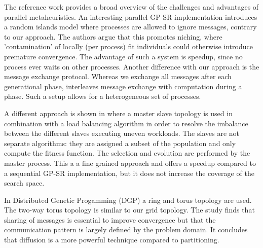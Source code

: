 The reference work \cite{parallelmetaheuristics} provides a broad overview of the challenges and advantages of parallel metaheuristics. An interesting parallel GP-SR implementation \citep{DGPSR} introduces a random islands model where processes are allowed to ignore messages, contrary to our approach. The authors argue that this promotes niching, where 'contamination' of locally (per process) fit individuals could otherwise introduce premature convergence. The advantage of such a system is speedup, since no process ever waits on other processes. Another difference with our approach is the message exchange protocol. 
Whereas we exchange all messages after each generational phase, \citep{DGPSR} interleaves message exchange with computation during a phase. Such a setup allows for a heterogeneous set of processes. 

A different approach is shown in \citep{DFGPSR} where a master slave topology is used in combination with a load balancing algorithm in order to resolve the imbalance between the different slaves executing uneven workloads. The slaves are not separate algorithms: they are assigned a subset of the population and only compute the fitness function. The selection and evolution are performed by the master process. This a a fine grained approach and  offers a speedup compared to a sequential GP-SR implementation, but it does not increase the coverage of the search space. 

In Distributed Genetic Progamming (DGP) \cite{DGP} a ring and torus topology are used. The two-way torus topology is similar to our grid topology. The study finds that sharing of messages is essential to improve convergence but that the communication pattern is largely defined by the problem domain. It concludes that diffusion is a more powerful technique compared to partitioning. 